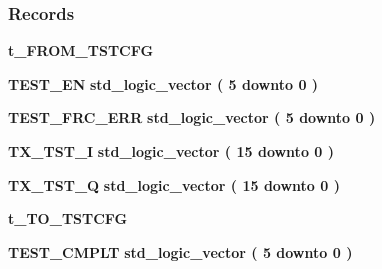 \subsubsection*{Records}
 \begin{DoxyCompactItemize}
\item 
{\bf t\+\_\+\+F\+R\+O\+M\+\_\+\+T\+S\+T\+C\+FG} {\bfseries  }
\item 
{\bf T\+E\+S\+T\+\_\+\+EN} {\bfseries {\bfseries \textcolor{comment}{std\+\_\+logic\+\_\+vector}\textcolor{vhdlchar}{ }\textcolor{vhdlchar}{(}\textcolor{vhdlchar}{ }\textcolor{vhdlchar}{ } \textcolor{vhdldigit}{5} \textcolor{vhdlchar}{ }\textcolor{keywordflow}{downto}\textcolor{vhdlchar}{ }\textcolor{vhdlchar}{ } \textcolor{vhdldigit}{0} \textcolor{vhdlchar}{ }\textcolor{vhdlchar}{)}\textcolor{vhdlchar}{ }}} 
\item 
{\bf T\+E\+S\+T\+\_\+\+F\+R\+C\+\_\+\+E\+RR} {\bfseries {\bfseries \textcolor{comment}{std\+\_\+logic\+\_\+vector}\textcolor{vhdlchar}{ }\textcolor{vhdlchar}{(}\textcolor{vhdlchar}{ }\textcolor{vhdlchar}{ } \textcolor{vhdldigit}{5} \textcolor{vhdlchar}{ }\textcolor{keywordflow}{downto}\textcolor{vhdlchar}{ }\textcolor{vhdlchar}{ } \textcolor{vhdldigit}{0} \textcolor{vhdlchar}{ }\textcolor{vhdlchar}{)}\textcolor{vhdlchar}{ }}} 
\item 
{\bf T\+X\+\_\+\+T\+S\+T\+\_\+I} {\bfseries {\bfseries \textcolor{comment}{std\+\_\+logic\+\_\+vector}\textcolor{vhdlchar}{ }\textcolor{vhdlchar}{(}\textcolor{vhdlchar}{ }\textcolor{vhdlchar}{ } \textcolor{vhdldigit}{15} \textcolor{vhdlchar}{ }\textcolor{keywordflow}{downto}\textcolor{vhdlchar}{ }\textcolor{vhdlchar}{ } \textcolor{vhdldigit}{0} \textcolor{vhdlchar}{ }\textcolor{vhdlchar}{)}\textcolor{vhdlchar}{ }}} 
\item 
{\bf T\+X\+\_\+\+T\+S\+T\+\_\+Q} {\bfseries {\bfseries \textcolor{comment}{std\+\_\+logic\+\_\+vector}\textcolor{vhdlchar}{ }\textcolor{vhdlchar}{(}\textcolor{vhdlchar}{ }\textcolor{vhdlchar}{ } \textcolor{vhdldigit}{15} \textcolor{vhdlchar}{ }\textcolor{keywordflow}{downto}\textcolor{vhdlchar}{ }\textcolor{vhdlchar}{ } \textcolor{vhdldigit}{0} \textcolor{vhdlchar}{ }\textcolor{vhdlchar}{)}\textcolor{vhdlchar}{ }}} 
\item 
{\bf t\+\_\+\+T\+O\+\_\+\+T\+S\+T\+C\+FG} {\bfseries  }
\item 
{\bf T\+E\+S\+T\+\_\+\+C\+M\+P\+LT} {\bfseries {\bfseries \textcolor{comment}{std\+\_\+logic\+\_\+vector}\textcolor{vhdlchar}{ }\textcolor{vhdlchar}{(}\textcolor{vhdlchar}{ }\textcolor{vhdlchar}{ } \textcolor{vhdldigit}{5} \textcolor{vhdlchar}{ }\textcolor{keywordflow}{downto}\textcolor{vhdlchar}{ }\textcolor{vhdlchar}{ } \textcolor{vhdldigit}{0} \textcolor{vhdlchar}{ }\textcolor{vhdlchar}{)}\textcolor{vhdlchar}{ }}} 

\end{DoxyCompactItemize}
